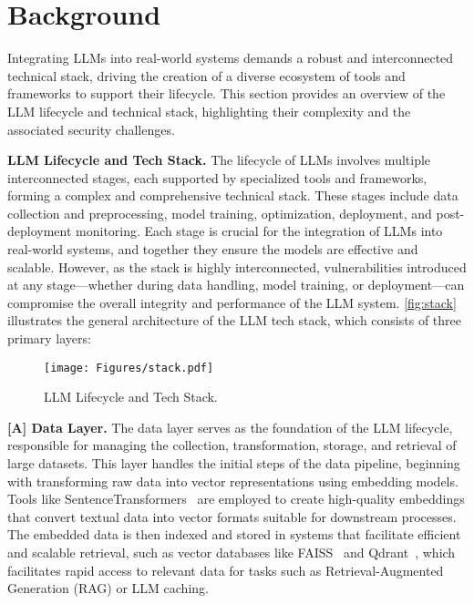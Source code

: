 \section{Background}
Integrating LLMs into real-world systems demands a robust and interconnected technical stack, driving the creation of a diverse ecosystem of tools and frameworks to support their lifecycle. This section provides an overview of the LLM lifecycle and technical stack, highlighting their complexity and the associated security challenges.

\noindent \textbf{LLM Lifecycle and Tech Stack.} The lifecycle of LLMs involves multiple interconnected stages, each supported by specialized tools and frameworks, forming a complex and comprehensive technical stack. These stages include data collection and preprocessing, model training, optimization, deployment, and post-deployment monitoring. Each stage is crucial for the integration of LLMs into real-world systems, and together they ensure the models are effective and scalable. However, as the stack is highly interconnected, vulnerabilities introduced at any stage—whether during data handling, model training, or deployment—can compromise the overall integrity and performance of the LLM system. \autoref{fig:stack} illustrates the general architecture of the LLM tech stack, which consists of three primary layers:
\begin{figure}[t]
    \centering
    \texttt{[image: Figures/stack.pdf]}
    \caption{LLM Lifecycle and Tech Stack.}
    \label{fig:stack}
\end{figure}

\noindent \textbf{[A] Data Layer.} The data layer serves as the foundation of the LLM lifecycle, responsible for managing the collection, transformation, storage, and retrieval of large datasets. This layer handles the initial steps of the data pipeline, beginning with transforming raw data into vector representations using embedding models. Tools like SentenceTransformers~\cite{sentence-transformers} are employed to create high-quality embeddings that convert textual data into vector formats suitable for downstream processes. The embedded data is then indexed and stored in systems that facilitate efficient and scalable retrieval, such as vector databases like FAISS~\cite{faiss} and Qdrant~\cite{qdrant}, which facilitates rapid access to relevant data for tasks such as Retrieval-Augmented Generation (RAG) or LLM caching. 
    
